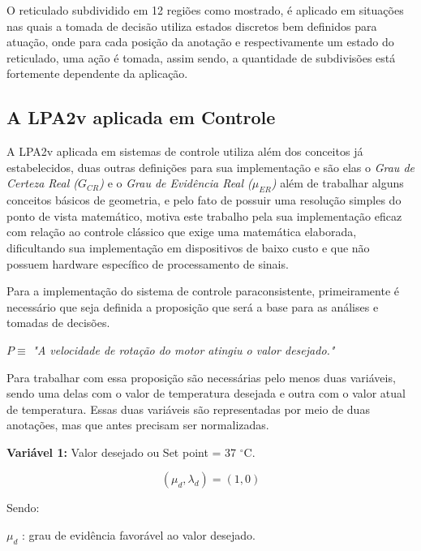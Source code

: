 O reticulado subdividido em 12 regiões como mostrado, é aplicado em situações nas quais a tomada de decisão utiliza estados discretos bem definidos para atuação, onde para cada posição da anotação e respectivamente um estado do reticulado, uma ação é tomada, assim sendo, a quantidade de subdivisões está fortemente dependente da aplicação.



\subsection{A LPA2v aplicada em Controle}

A LPA2v aplicada em sistemas de controle utiliza além dos conceitos já estabelecidos, duas outras definições para sua implementação e são elas o \emph{ Grau de Certeza Real ($G _{CR}$)} e o \emph{Grau de Evidência Real ($\mu _{ER}$)} além de trabalhar alguns conceitos básicos de geometria, e pelo fato de possuir uma resolução simples do ponto de vista matemático, motiva este trabalho pela sua implementação eficaz com relação ao controle clássico que exige uma matemática elaborada, dificultando sua implementação em dispositivos de baixo custo e que não possuem hardware específico de processamento de sinais. 


Para a implementação do sistema de controle paraconsistente, primeiramente é necessário que seja definida a proposição que será a base para as análises e tomadas de decisões.

\begin{center}
$ P \equiv $ 
\emph{"A velocidade de rotação do motor atingiu o valor desejado."}
\end{center}

Para trabalhar com essa proposição são necessárias pelo menos duas variáveis, sendo uma delas com o valor de temperatura desejada e outra com o valor atual de temperatura. Essas duas variáveis são representadas por meio de duas anotações, mas que antes precisam ser normalizadas. 

\textbf{Variável 1:} 
Valor desejado ou Set point = 37 $^{\circ}$C. 

\begin{equation}
( \mu _{d}, \lambda _{d} ) = (1,0)
\label{eq:setpoint}
\end{equation}

Sendo:

$\mu _{d}$ : grau de evidência favorável ao valor desejado. 

